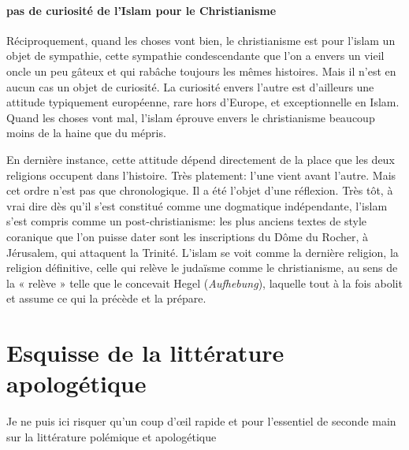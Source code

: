 \paragraph{pas de curiosité de l'Islam pour le Christianisme}
Réciproquement, quand les choses vont bien, le christianisme est pour l'islam un objet de sympathie, cette sympathie condescendante que l'on a envers un vieil oncle un peu gâteux et qui rabâche toujours les mêmes histoires. Mais il n'est en aucun cas un objet de curiosité. La curiosité envers l'autre est d'ailleurs une attitude typiquement européenne, rare hors d'Europe, et exceptionnelle en Islam. Quand les choses vont mal, l'islam éprouve envers le christianisme beaucoup moins de la haine que du mépris.


En dernière instance, cette attitude dépend directement de la place que les deux religions occupent dans l'histoire. Très platement: l'une vient avant l'autre. Mais cet ordre n'est pas que chronologique. Il a été l'objet d'une réflexion. Très tôt, à vrai dire dès qu'il s'est constitué comme une dogmatique indépendante, l'islam s'est compris comme un post-christianisme: les plus anciens textes de style coranique que l'on puisse dater sont les inscriptions du Dôme du Rocher, à Jérusalem, qui attaquent la Trinité. L'islam se voit comme la dernière religion, la religion définitive, celle qui relève le judaïsme comme le christianisme, au sens de la « relève » telle que le concevait Hegel (\textit{Aufhebung}), laquelle tout à la fois abolit et assume ce qui la précède et la prépare.

\section{Esquisse de la littérature apologétique}

Je ne puis ici risquer qu'un coup d'œil rapide et pour l'essentiel de seconde main sur la littérature polémique et apologétique
